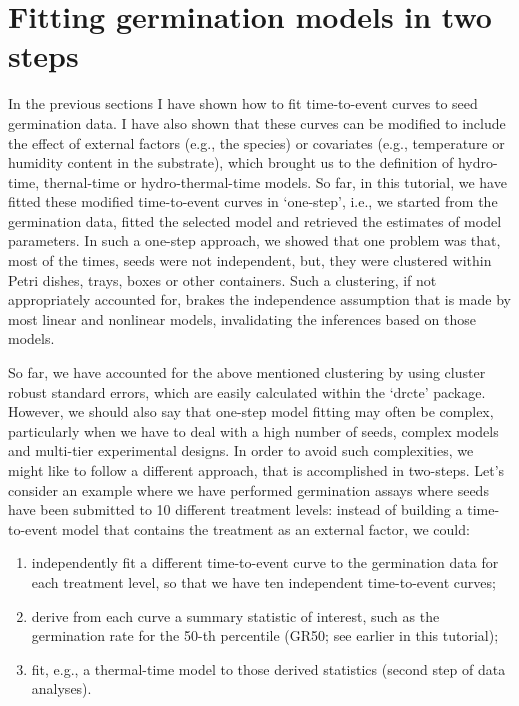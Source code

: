 \documentclass[
]{book}
\providecommand{\tightlist}{%
  \setlength{\itemsep}{0pt}\setlength{\parskip}{0pt}}
\begin{document}
\hypertarget{fitting-germination-models-in-two-steps}{%
\chapter{Fitting germination models in two steps}\label{fitting-germination-models-in-two-steps}}

In the previous sections I have shown how to fit time-to-event curves to seed germination data. I have also shown that these curves can be modified to include the effect of external factors (e.g., the species) or covariates (e.g., temperature or humidity content in the substrate), which brought us to the definition of hydro-time, thernal-time or hydro-thermal-time models. So far, in this tutorial, we have fitted these modified time-to-event curves in `one-step', i.e., we started from the germination data, fitted the selected model and retrieved the estimates of model parameters. In such a one-step approach, we showed that one problem was that, most of the times, seeds were not independent, but, they were clustered within Petri dishes, trays, boxes or other containers. Such a clustering, if not appropriately accounted for, brakes the independence assumption that is made by most linear and nonlinear models, invalidating the inferences based on those models.

So far, we have accounted for the above mentioned clustering by using cluster robust standard errors, which are easily calculated within the `drcte' package. However, we should also say that one-step model fitting may often be complex, particularly when we have to deal with a high number of seeds, complex models and multi-tier experimental designs. In order to avoid such complexities, we might like to follow a different approach, that is accomplished in two-steps. Let's consider an example where we have performed germination assays where seeds have been submitted to 10 different treatment levels: instead of building a time-to-event model that contains the treatment as an external factor, we could:

\begin{enumerate}
\def\labelenumi{\arabic{enumi}.}
\tightlist
\item
  independently fit a different time-to-event curve to the germination data for each treatment level, so that we have ten independent time-to-event curves;
\item
  derive from each curve a summary statistic of interest, such as the germination rate for the 50-th percentile (GR50; see earlier in this tutorial);
\item
  fit, e.g., a thermal-time model to those derived statistics (second step of data analyses).
\end{enumerate}
\end{document}
